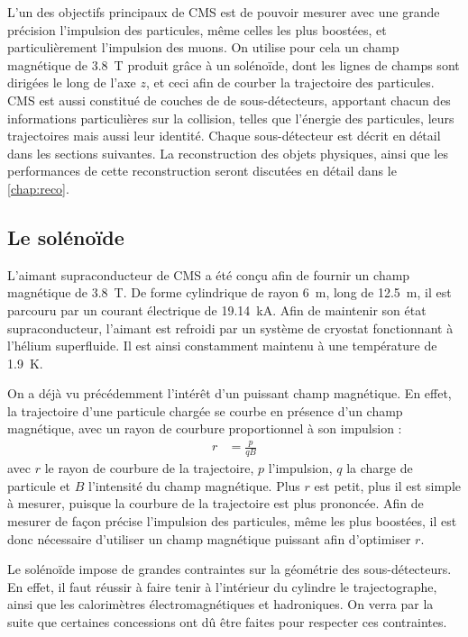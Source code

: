 
L'un des objectifs principaux de CMS est de pouvoir mesurer avec une grande précision l'impulsion des particules, même celles les plus boostées, et particulièrement l'impulsion des muons. On utilise pour cela un champ magnétique de \SI{3.8}{\tesla} produit grâce à un solénoïde, dont les lignes de champs sont dirigées le long de l'axe $z$, et ceci afin de courber la trajectoire des particules. CMS est aussi constitué de couches de de sous-détecteurs, apportant chacun des informations particulières sur la collision, telles que l'énergie des particules, leurs trajectoires mais aussi leur identité. Chaque sous-détecteur est décrit en détail dans les sections suivantes. La reconstruction des objets physiques, ainsi que les performances de cette reconstruction seront discutées en détail dans le \cref{chap:reco}.

\subsection{Le solénoïde}

L'aimant supraconducteur de CMS a été conçu afin de fournir un champ magnétique de \SI{3.8}{\tesla}. De forme cylindrique de rayon \SI{6}{\m}, long de \SI{12.5}{\meter}, il est parcouru par un courant électrique de \SI{19.14}{\kilo\ampere}. Afin de maintenir son état supraconducteur, l'aimant est refroidi par un système de cryostat fonctionnant à l'hélium superfluide. Il est ainsi constamment maintenu à une température de \SI{1.9}{\kelvin}.

On a déjà vu précédemment l'intérêt d'un puissant champ magnétique. En effet, la trajectoire d'une particule chargée se courbe en présence d'un champ magnétique, avec un rayon de courbure proportionnel à son impulsion :
\begin{align*}
  r &= \frac{p}{qB}
\end{align*}
avec $r$ le rayon de courbure de la trajectoire, $p$ l'impulsion, $q$ la charge de particule et $B$ l'intensité du champ magnétique. Plus $r$ est petit, plus il est simple à mesurer, puisque la courbure de la trajectoire est plus prononcée. Afin de mesurer de façon précise l'impulsion des particules, même les plus boostées, il est donc nécessaire d'utiliser un champ magnétique puissant afin d'optimiser $r$.

\medskip

Le solénoïde impose de grandes contraintes sur la géométrie des sous-détecteurs. En effet, il faut réussir à faire tenir à l'intérieur du cylindre le trajectographe, ainsi que les calorimètres électromagnétiques et hadroniques. On verra par la suite que certaines concessions ont dû être faites pour respecter ces contraintes.

